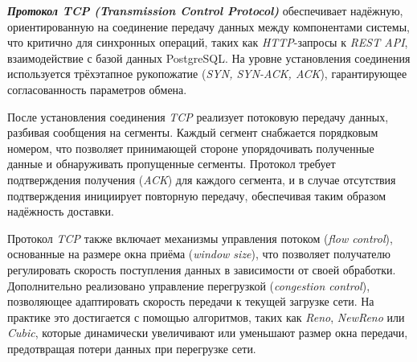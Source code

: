 
\textit{\textbf{Протокол TCP (Transmission Control Protocol)}} обеспечивает надёжную, ориентированную на соединение передачу данных между компонентами системы, что критично для синхронных операций, таких как \textit{HTTP}-запросы к \textit{REST API}, взаимодействие с базой данных PostgreSQL. На уровне установления соединения используется трёхэтапное рукопожатие (\textit{SYN, SYN-ACK, ACK}), гарантирующее согласованность параметров обмена.

После установления соединения \textit{TCP} реализует потоковую передачу данных, разбивая сообщения на сегменты. Каждый сегмент снабжается порядковым номером, что позволяет принимающей стороне упорядочивать полученные данные и обнаруживать пропущенные сегменты. Протокол требует подтверждения получения (\textit{ACK}) для каждого сегмента, и в случае отсутствия подтверждения инициирует повторную передачу, обеспечивая таким образом надёжность доставки.

Протокол \textit{TCP} также включает механизмы управления потоком (\textit{flow control}), основанные на размере окна приёма (\textit{window size}), что позволяет получателю регулировать скорость поступления данных в зависимости от своей обработки. Дополнительно реализовано управление перегрузкой (\textit{congestion control}), позволяющее адаптировать скорость передачи к текущей загрузке сети. На практике это достигается с помощью алгоритмов, таких как \textit{Reno}, \textit{NewReno} или \textit{Cubic}, которые динамически увеличивают или уменьшают размер окна передачи, предотвращая потери данных при перегрузке сети.

